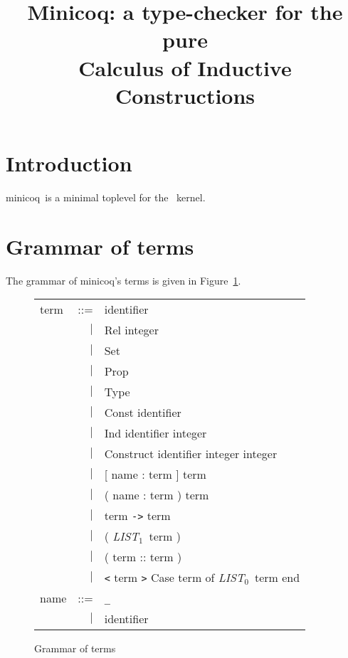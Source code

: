 \documentclass{article}
\title{Minicoq: a type-checker for the pure \\ 
       Calculus of Inductive Constructions}
\newcommand{\minicoq}{\textsf{minicoq}}
\newcommand{\terminal}[1]{\textsf{#1}}
\newcommand{\listzero}{\textit{LIST$_0$}}
\newcommand{\listun}{\textit{LIST$_1$}}
\begin{document}
\maketitle

\section{Introduction}

\minicoq\ is a minimal toplevel for the \Coq\ kernel.


\section{Grammar of terms}

The grammar of \minicoq's terms is given in Figure~\ref{fig:terms}. 

\begin{figure}[htbp]
  \hrulefill
  \begin{center}
    \begin{tabular}{lrl}
      term & ::= & identifier \\
           & $|$ & \terminal{Rel} integer \\
           & $|$ & \terminal{Set} \\
           & $|$ & \terminal{Prop} \\
           & $|$ & \terminal{Type} \\
           & $|$ & \terminal{Const} identifier \\
           & $|$ & \terminal{Ind} identifier integer \\
           & $|$ & \terminal{Construct} identifier integer integer \\
           & $|$ & \terminal{[} name \terminal{:} term
                   \terminal{]} term \\
           & $|$ & \terminal{(} name \terminal{:} term
                   \terminal{)} term \\
           & $|$ & term \verb!->! term \\
           & $|$ & \terminal{(} \listun\ term \terminal{)} \\
           & $|$ & \terminal{(} term \terminal{::} term \terminal{)} \\
           & $|$ & \verb!<! term \verb!>! \terminal{Case}
                   term \terminal{of} \listzero\ term \terminal{end} 
      \\[1em]
      name & ::= & \verb!_! \\
           & $|$ & identifier 
   \end{tabular}
  \end{center}
  \hrulefill
  \caption{Grammar of terms}
  \label{fig:terms}
\end{figure}
\end{document}
